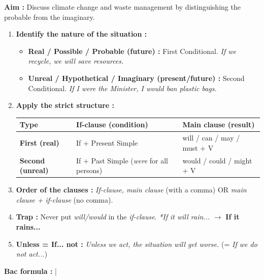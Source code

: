 \documentclass[11pt]{article}
\newcommand{\cle}[1]{{\popxbold\color{popdark}#1}}
\begin{document}
\begin{methode}
\textbf{Aim :} Discuss climate change and waste management by distinguishing the probable from the imaginary.
\begin{enumerate}
    \item \textbf{Identify the nature of the situation :}
    \begin{itemize}
        \item \textbf{Real / Possible / Probable (future) :} \cle{First Conditional}. \textit{If we recycle, we will save resources.}
        \item \textbf{Unreal / Hypothetical / Imaginary (present/future) :} \cle{Second Conditional}. \textit{If I were the Minister, I would ban plastic bags.}
    \end{itemize}
    \item \textbf{Apply the strict structure :}
    \begin{center}
    \begin{tabular}{|l|l|l|}\hline
    \textbf{Type} & \textbf{If-clause (condition)} & \textbf{Main clause (result)} \\ \hline
    \textbf{First (real)} & \cle{If + Present Simple} & \cle{will / can / may / must + V} \\ \hline
    \textbf{Second (unreal)} & \cle{If + Past Simple (\textit{were} for all persons)} & \cle{would / could / might + V} \\ \hline
    \end{tabular}
    \end{center}
    \item \textbf{Order of the clauses :} \textit{If-clause, main clause} (with a comma) OR \textit{main clause + if-clause} (no comma).
    \item \textbf{Trap :} Never put \textit{will/would} in the \textit{if-clause}. \textit{*If it will rain...} $\rightarrow$ \textbf{If it rains...}
    \item \textbf{\cle{Unless} = If... not :} \textit{Unless we act, the situation will get worse.} (= \textit{If we do not act...})
\end{enumerate}
\textbf{Bac formula :}  \quad | \quad {}
\end{methode}
\end{document}
